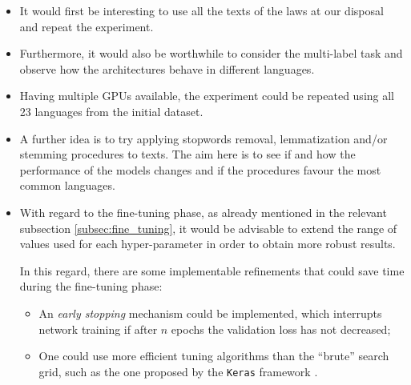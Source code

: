 \documentclass[letterpaper,11pt]{article}
\begin{document}
\begin{itemize}
  \item It would first be interesting to use all the texts of the laws at our disposal and repeat the experiment.
  \item Furthermore, it would also be worthwhile to consider the multi-label task and observe how the architectures behave in different languages.
  \item Having multiple GPUs available, the experiment could be repeated using all 23 languages from the initial dataset.
  \item A further idea is to try applying stopwords removal, lemmatization and/or stemming procedures to texts. The aim here is to see if and how the performance of the models changes and if the procedures favour the most common languages.
  \item With regard to the fine-tuning phase, as already mentioned in the relevant subsection \ref{subsec:fine_tuning}, it would be advisable to extend the range of values used for each hyper-parameter in order to obtain more robust results. 
  
  In this regard, there are some implementable refinements that could save time during the fine-tuning phase:
  \begin{itemize}
    \item An \textit{early stopping} mechanism could be implemented, which interrupts network training if after $n$ epochs the validation loss has not decreased;
    \item One could use more efficient tuning algorithms than the ``brute'' search grid, such as the one proposed by the \verb|Keras| framework \cite{omalley2019kerastuner}. 
  \end{itemize}
\end{itemize}

\end{document}

